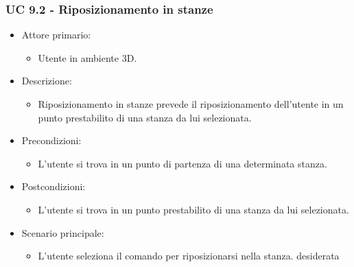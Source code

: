 \subsubsection{UC 9.2 - Riposizionamento in stanze}
\begin{itemize}

	\item Attore primario: 
	\begin{itemize}
		\item Utente in ambiente 3D.
	\end{itemize}
	\item Descrizione:
	\begin{itemize}
		\item Riposizionamento in stanze prevede il riposizionamento dell'utente in un punto prestabilito di una stanza da lui selezionata.
	\end{itemize}
	
	\item Precondizioni:
	\begin{itemize}
		\item L'utente si trova in un punto di partenza di una determinata stanza.
	\end{itemize}
	
	\item Postcondizioni:
	\begin{itemize}
		\item L'utente si trova in un punto prestabilito di una stanza da lui selezionata.
	\end{itemize}
	
	\item Scenario principale:
	\begin{itemize}
		\item L'utente seleziona il comando per riposizionarsi nella stanza. desiderata
	\end{itemize}
	
\end{itemize}

\pagebreak

